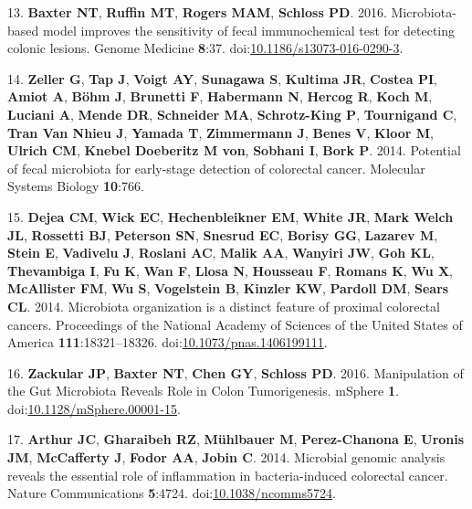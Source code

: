 \documentclass[12pt,]{article}
\begin{document}
\hypertarget{ref-baxter_microbiota-based_2016}{}
13. \textbf{Baxter NT}, \textbf{Ruffin MT}, \textbf{Rogers MAM},
\textbf{Schloss PD}. 2016. Microbiota-based model improves the
sensitivity of fecal immunochemical test for detecting colonic lesions.
Genome Medicine \textbf{8}:37.
doi:\href{https://doi.org/10.1186/s13073-016-0290-3}{10.1186/s13073-016-0290-3}.

\hypertarget{ref-zeller_potential_2014}{}
14. \textbf{Zeller G}, \textbf{Tap J}, \textbf{Voigt AY},
\textbf{Sunagawa S}, \textbf{Kultima JR}, \textbf{Costea PI},
\textbf{Amiot A}, \textbf{Böhm J}, \textbf{Brunetti F},
\textbf{Habermann N}, \textbf{Hercog R}, \textbf{Koch M},
\textbf{Luciani A}, \textbf{Mende DR}, \textbf{Schneider MA},
\textbf{Schrotz-King P}, \textbf{Tournigand C}, \textbf{Tran Van Nhieu
J}, \textbf{Yamada T}, \textbf{Zimmermann J}, \textbf{Benes V},
\textbf{Kloor M}, \textbf{Ulrich CM}, \textbf{Knebel Doeberitz M von},
\textbf{Sobhani I}, \textbf{Bork P}. 2014. Potential of fecal microbiota
for early-stage detection of colorectal cancer. Molecular Systems
Biology \textbf{10}:766.

\hypertarget{ref-dejea_microbiota_2014}{}
15. \textbf{Dejea CM}, \textbf{Wick EC}, \textbf{Hechenbleikner EM},
\textbf{White JR}, \textbf{Mark Welch JL}, \textbf{Rossetti BJ},
\textbf{Peterson SN}, \textbf{Snesrud EC}, \textbf{Borisy GG},
\textbf{Lazarev M}, \textbf{Stein E}, \textbf{Vadivelu J},
\textbf{Roslani AC}, \textbf{Malik AA}, \textbf{Wanyiri JW}, \textbf{Goh
KL}, \textbf{Thevambiga I}, \textbf{Fu K}, \textbf{Wan F}, \textbf{Llosa
N}, \textbf{Housseau F}, \textbf{Romans K}, \textbf{Wu X},
\textbf{McAllister FM}, \textbf{Wu S}, \textbf{Vogelstein B},
\textbf{Kinzler KW}, \textbf{Pardoll DM}, \textbf{Sears CL}. 2014.
Microbiota organization is a distinct feature of proximal colorectal
cancers. Proceedings of the National Academy of Sciences of the United
States of America \textbf{111}:18321--18326.
doi:\href{https://doi.org/10.1073/pnas.1406199111}{10.1073/pnas.1406199111}.

\hypertarget{ref-zackular_manipulation_2016}{}
16. \textbf{Zackular JP}, \textbf{Baxter NT}, \textbf{Chen GY},
\textbf{Schloss PD}. 2016. Manipulation of the Gut Microbiota Reveals
Role in Colon Tumorigenesis. mSphere \textbf{1}.
doi:\href{https://doi.org/10.1128/mSphere.00001-15}{10.1128/mSphere.00001-15}.

\hypertarget{ref-arthur_microbial_2014}{}
17. \textbf{Arthur JC}, \textbf{Gharaibeh RZ}, \textbf{Mühlbauer M},
\textbf{Perez-Chanona E}, \textbf{Uronis JM}, \textbf{McCafferty J},
\textbf{Fodor AA}, \textbf{Jobin C}. 2014. Microbial genomic analysis
reveals the essential role of inflammation in bacteria-induced
colorectal cancer. Nature Communications \textbf{5}:4724.
doi:\href{https://doi.org/10.1038/ncomms5724}{10.1038/ncomms5724}.
\end{document}

